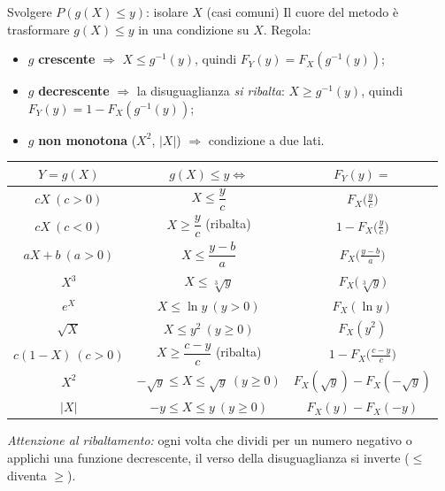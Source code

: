 \documentclass[11pt]{article}
\begin{document}
\begin{concetto}[barGreen]{Svolgere $P(g(X)\le y)$: isolare $X$ (casi comuni)}
Il cuore del metodo \`e trasformare $g(X)\le y$ in una condizione su $X$. Regola:
\begin{itemize}[leftmargin=1.2em,itemsep=1pt,topsep=2pt]
\item $g$ \textbf{crescente} $\Rightarrow$ $X\le g^{-1}(y)$, quindi $F_Y(y)=F_X(g^{-1}(y))$;
\item $g$ \textbf{decrescente} $\Rightarrow$ la disuguaglianza \emph{si ribalta}: $X\ge g^{-1}(y)$, quindi $F_Y(y)=1-F_X(g^{-1}(y))$;
\item $g$ \textbf{non monotona} ($X^2$, $|X|$) $\Rightarrow$ condizione a due lati.
\end{itemize}
\renewcommand{\arraystretch}{1.8}
\begin{center}
\begin{tabular}{c|c|c}
$Y=g(X)$ & $g(X)\le y \iff$ & $F_Y(y)=$ \\
\hline
$cX\ (c>0)$ & $X\le \dfrac{y}{c}$ & $F_X\!\big(\tfrac{y}{c}\big)$ \\
$cX\ (c<0)$ & $X\ge \dfrac{y}{c}$ (ribalta) & $1-F_X\!\big(\tfrac{y}{c}\big)$ \\
$aX+b\ (a>0)$ & $X\le \dfrac{y-b}{a}$ & $F_X\!\big(\tfrac{y-b}{a}\big)$ \\
$X^3$ & $X\le \sqrt[3]{y}$ & $F_X\!\big(\sqrt[3]{y}\big)$ \\
$e^{X}$ & $X\le \ln y\ (y>0)$ & $F_X(\ln y)$ \\
$\sqrt{X}$ & $X\le y^2\ (y\ge0)$ & $F_X(y^2)$ \\
$c(1-X)\ (c>0)$ & $X\ge \dfrac{c-y}{c}$ (ribalta) & $1-F_X\!\big(\tfrac{c-y}{c}\big)$ \\
$X^2$ & $-\sqrt{y}\le X\le \sqrt{y}\ (y\ge0)$ & $F_X(\sqrt{y})-F_X(-\sqrt{y})$ \\
$|X|$ & $-y\le X\le y\ (y\ge0)$ & $F_X(y)-F_X(-y)$ \\
\end{tabular}
\end{center}
\renewcommand{\arraystretch}{1}
\emph{Attenzione al ribaltamento:} ogni volta che dividi per un numero negativo o applichi una funzione decrescente, il verso della disuguaglianza si inverte ($\le$ diventa $\ge$).
\end{concetto}
\end{document}
